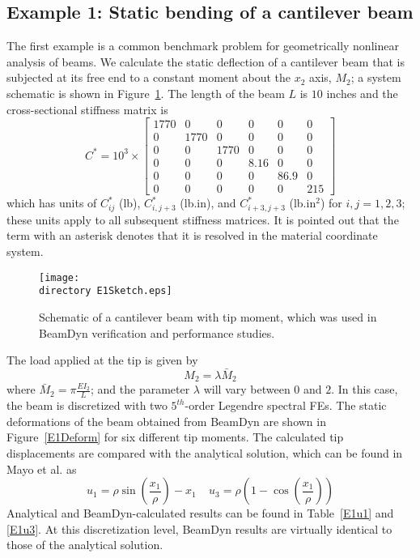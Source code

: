 \subsection{Example 1: Static bending of a cantilever beam}

The first example is a common benchmark problem for geometrically nonlinear
analysis of beams\cite{Simo1985,Xiao-Zhong:2012}. We calculate the static
deflection of a cantilever beam that is subjected at its free end to
a constant moment about the $x_2$ axis, $M_2$; a system schematic is shown in Figure~\ref{E1Sketch}.  The length of the beam $L$ is $10$ inches and the cross-sectional stiffness 
matrix is 
\begin{equation}
    \label{StifE1}
    C^* = 10^3 \times \begin{bmatrix}
	1770 & 0    & 0    & 0    & 0    & 0   \\
	 0    & 1770 & 0    & 0    & 0    & 0   \\
	 0   &   0   & 1770 & 0    & 0    & 0   \\
	 0   &   0   &  0    & 8.16 & 0    & 0   \\
	 0   &   0   &  0    &  0    & 86.9 & 0   \\
	 0   &   0   &  0    &  0    &   0   & 215
\end{bmatrix}
\end{equation}
which has units of $C_{ij}^*$ (lb), $C_{i,j+3}^*$ (lb.in), and
$C_{i+3,j+3}^*$ (lb.in$^2$) for $i,j = 1,2,3$; these units apply to all
subsequent stiffness matrices. It is pointed out that the term with an
asterisk denotes that it is resolved in the material coordinate system. 

\begin{figure}
    \centering \texttt{[image: \\directory
E1Sketch.eps]} \caption{Schematic of a cantilever beam with tip moment,
which was used in BeamDyn verification and performance studies.}
    \label{E1Sketch}
\end{figure} 

The load applied at the tip is given by 
\begin{equation}
    \label{E1Load}
    M_2 = \lambda \bar{M}_2
\end{equation}
where $\bar{M}_2 = \pi \frac{EI_2}{L}$; and the parameter $\lambda$ will vary between $0$ and $2$. In 
this case, the beam is discretized with two $5^{th}$-order Legendre
spectral FEs. The
static deformations of the beam obtained from BeamDyn are shown in
Figure~\ref{E1Deform} for six different tip moments.
The calculated tip displacements are compared with the analytical solution,
which can be found in Mayo et al.\cite{Mayo-etal:2004} as
\begin{equation}
    \label{E1Analytical}
    u_1 = \rho \sin \left( \frac{x_1}{\rho} \right) - x_1~~~~~u_3 = \rho
\left(1-\cos\left(\frac{x_1}{\rho}\right) \right)
\end{equation}
Analytical and BeamDyn-calculated results can be found in Table~\ref{E1u1}
and \ref{E1u3}. At this discretization level, BeamDyn results are virtually
identical to those of the analytical solution.

